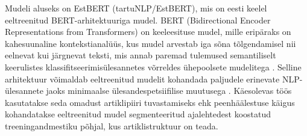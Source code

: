 Mudeli aluseks on EstBERT (tartuNLP/EstBERT), mis on eesti keelel eeltreenitud BERT-arhitektuuriga mudel. BERT (Bidirectional Encoder Representations from Transformers) on keeleesituse mudel, mille eripäraks on kahesuunaline kontekstianalüüs, kus mudel arvestab iga sõna tõlgendamisel nii eelnevat kui järgnevat teksti, mis annab paremad tulemused semantiliselt keerulistes klassifitseerimisülesannetes võrreldes ühepoolsete mudelitega \cite{devlin2019}. Selline arhitektuur võimaldab eeltreenitud mudelit kohandada paljudele erinevate NLP-ülesannete jaoks minimaalse ülesandespetsiifilise muutusega \cite{wolf2020}. Käesolevas töös kasutatakse seda omadust artiklipiiri tuvastamiseks ehk peenhäälestuse käigus kohandatakse eeltreenitud mudel segmenteeritud ajalehtedest koostatud treeningandmestiku põhjal, kus artiklistruktuur on teada.
